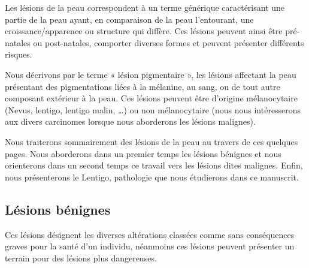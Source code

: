 Les lésions de la peau correspondent à un terme générique caractérisant une partie de la peau ayant, en comparaison de la peau l’entourant, une croissance/apparence ou structure qui diffère. Ces lésions peuvent ainsi être pré-natales ou post-natales, comporter diverses formes et peuvent présenter différents risques.\par

Nous décrivons par le terme « lésion pigmentaire », les lésions affectant la peau présentant des pigmentations liées à la mélanine, au sang, ou de tout autre composant extérieur à la peau. Ces lésions peuvent être d’origine mélanocytaire (Nevus, lentigo, lentigo malin, \ldots) ou non mélanocytaire (nous nous intéresserons aux divers carcinomes lorsque nous aborderons les lésions malignes).\par

Nous traiterons sommairement des lésions de la peau au travers de ces quelques pages. Nous aborderons dans un premier temps les lésions bénignes et nous orienterons dans un second temps ce travail vers les lésions dites malignes. Enfin, nous présenterons le Lentigo, pathologie que nous étudierons dans ce manuscrit.\par

\subsection{Lésions bénignes}
Ces lésions désignent les diverses altérations classées comme sans conséquences graves pour la santé d'un individu, néanmoins ces lésions peuvent présenter un terrain pour des lésions plus dangereuses.\par

